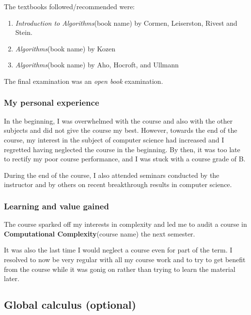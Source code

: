 \documentclass[a4paper]{amsart}
\newcommand{\coursename}[1]{{\bf #1}{\small{(course name)}}}
\newcommand{\bookname}[1]{{\em #1}{\small{(book name)}}}
\begin{document}
The textbooks followed/recommended were:

\begin{enumerate}

\item \bookname{Introduction to Algorithms} by Cormen, Leiserston, Rivest and Stein. 

\item \bookname{Algorithms} by Kozen

\item \bookname{Algorithms} by Aho, Hocroft, and Ullmann

\end{enumerate}

The final examination was an {\em open book} examination.

\subsubsection{My personal experience}

In the beginning, I was overwhelmed with the course and also with the
other subjects and did not give the course my best.  However, towards
the end of the course, my interest in the subject of computer science
had increased and I regretted having neglected the course in the
beginning. By then, it was too late to rectify my poor course
performance, and I was stuck with a course grade of B.

During the end of the course, I also attended seminars conducted by the 
instructor and by others on recent breakthrough results in computer science.

\subsubsection{Learning and value gained}

The course sparked off my interests in complexity and led me to audit
a course in \coursename{Computational Complexity} the next semester.

It was also the last time I would neglect a course even for part of
the term. I resolved to now be very regular with all my course work
and to try to get benefit from the course while it was gonig on rather
than trying to learn the material later.

\subsection{Global calculus (optional)}\label{globalcalculus}
\end{document}
